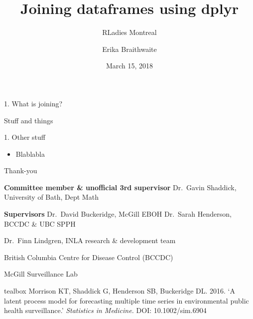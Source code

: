 \documentclass[ignorenonframetext,]{beamer}
\title{Joining dataframes using dplyr}
\subtitle{RLadies Montreal}
\author{Erika Braithwaite \newline}
\date{March 15, 2018}
\providecommand{\tightlist}{%
  \setlength{\itemsep}{0pt}\setlength{\parskip}{0pt}}
\begin{document}
\frame{\titlepage}

\begin{frame}{1. What is joining?}

Stuff and things

\end{frame}

\begin{frame}{1. Other stuff}

\begin{itemize}
\tightlist
\item
  Blablabla
\end{itemize}

\vspace{2mm}

\end{frame}

\begin{frame}{Thank-you}

\small
\textbf{Committee member \& unofficial 3rd supervisor} \newline
Dr.~Gavin Shaddick, University of Bath, Dept Math

\vspace{2mm} \textbf{Supervisors} \newline
Dr.~David Buckeridge, McGill EBOH \newline
Dr.~Sarah Henderson, BCCDC \& UBC SPPH

\vspace{2mm}

Dr.~Finn Lindgren, INLA research \& development team

\vspace{2mm}

British Columbia Centre for Disease Control (BCCDC)

\vspace{2mm}

McGill Surveillance Lab

\vspace{5mm}


\begin{beamercolorbox}[sep=1mm]{tealbox}
\footnotesize
Morrison KT, Shaddick G, Henderson SB, Buckeridge DL. 2016. `A latent process model for forecasting multiple time series in environmental public health surveillance.' \emph{Statistics in Medicine.} DOI: 10.1002/sim.6904
\end{beamercolorbox}

\end{frame}
\end{document}

